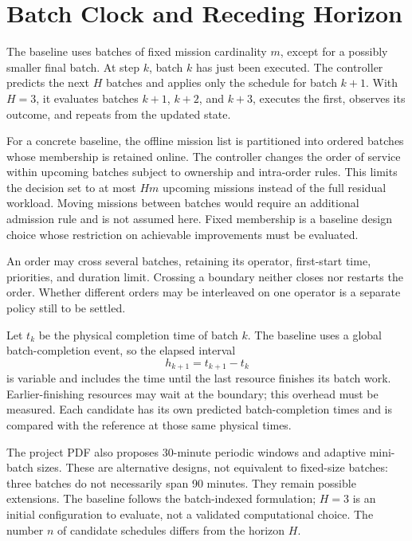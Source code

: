\section{Batch Clock and Receding Horizon}

The baseline uses batches of fixed mission cardinality $m$, except for a
possibly smaller final batch. At step $k$, batch $k$ has just been executed.
The controller predicts the next $H$ batches and applies only the schedule
for batch $k+1$. With $H=3$, it evaluates batches $k+1$, $k+2$, and $k+3$,
executes the first, observes its outcome, and repeats from the updated state.

For a concrete baseline, the offline mission list is partitioned into ordered
batches whose membership is retained online. The controller changes the order
of service within upcoming batches subject to ownership and intra-order
rules. This limits the decision set to at most $Hm$ upcoming missions instead
of the full residual workload. Moving missions between batches would require
an additional admission rule and is not assumed here. Fixed membership is a
baseline design choice whose restriction on achievable improvements must be
evaluated.

An order may cross several batches, retaining its operator, first-start time,
priorities, and duration limit. Crossing a boundary neither closes nor
restarts the order. Whether different orders may be interleaved on one
operator is a separate policy still to be settled.

Let $t_k$ be the physical completion time of batch $k$. The baseline uses a
global batch-completion event, so the elapsed interval
\begin{equation}
 h_{k+1}=t_{k+1}-t_k
\end{equation}
is variable and includes the time until the last resource finishes its batch
work. Earlier-finishing resources may wait at the boundary; this overhead
must be measured. Each candidate has its own predicted batch-completion times
and is compared with the reference at those same physical times.

The project PDF also proposes 30-minute periodic windows and adaptive
mini-batch sizes. These are alternative designs, not equivalent to fixed-size
batches: three batches do not necessarily span 90 minutes. They remain
possible extensions. The baseline follows the batch-indexed formulation;
$H=3$ is an initial configuration to evaluate, not a validated computational
choice. The number $n$ of candidate schedules differs from the horizon $H$.

